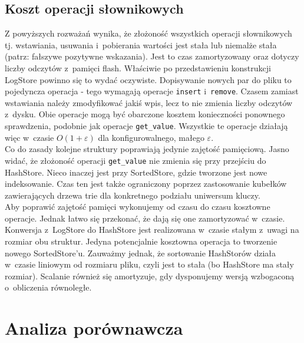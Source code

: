 \documentclass[declaration,shortabstract,masc]{iithesis}
\begin{document}
		\section{Koszt operacji słownikowych}
			Z powyższych rozważań wynika, że złożoność wszystkich operacji słownikowych tj. wstawiania, usuwania i~pobierania wartości jest stała lub niemalże stała (patrz: fałszywe pozytywne wskazania). Jest to czas zamortyzowany oraz dotyczy liczby odczytów z~pamięci flash. Właściwie po przedstawieniu konstrukcji LogStore powinno się to wydać oczywiste. Dopisywanie nowych par do pliku to pojedyncza operacja - tego wymagają operacje \texttt{insert} i~\texttt{remove}. Czasem zamiast wstawiania należy zmodyfikować jakiś wpis, lecz to nie zmienia liczby odczytów z~dysku. Obie operacje mogą być obarczone kosztem konieczności ponownego sprawdzenia, podobnie jak operacje \texttt{get\_value}. Wszystkie te operacje działają więc w~czasie $O(1+\varepsilon)$ dla konfigurowalnego, małego $\varepsilon$.\\
			\indent Co do zasady kolejne struktury poprawiają jedynie zajętość pamięciową. Jasno widać, że złożoność operacji \texttt{get\_value} nie zmienia się przy przejściu do HashStore. Nieco inaczej jest przy SortedStore, gdzie tworzone jest nowe indeksowanie. Czas ten jest także ograniczony poprzez zastosowanie kubełków zawierających drzewa trie dla konkretnego podziału uniwersum kluczy.\\
			\indent Aby poprawić zajętość pamięci wykonujemy od czasu do czasu kosztowne operacje. Jednak łatwo się przekonać, że dają się one zamortyzować w~czasie. Konwersja z~LogStore do HashStore jest realizowana w~czasie stałym z~uwagi na rozmiar obu struktur. Jedyna potencjalnie kosztowna operacja to tworzenie nowego SortedStore'u. Zauważmy jednak, że sortowanie HashStorów działa w~czasie liniowym od rozmiaru pliku, czyli jest to stała (bo HashStore ma stały rozmiar). Scalanie również się amortyzuje, gdy dysponujemy wersją wzbogaconą o~obliczenia równoległe.
	\chapter{Analiza porównawcza}
\end{document}
